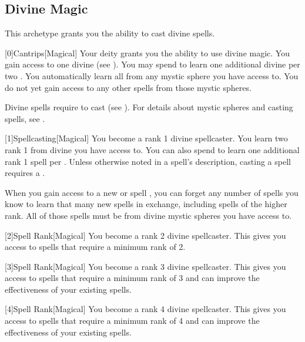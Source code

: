     \newpage
    \subsection{Divine Magic}
        This archetype grants you the ability to cast divine spells.

        [0]{Cantrips}[Magical]
        Your deity grants you the ability to use divine magic.
        You gain access to one divine  (see ).
        You may spend  to learn one additional divine  per two .
        You automatically learn all  from any mystic sphere you have access to.
        You do not yet gain access to any other spells from those mystic spheres.

        Divine spells require  to cast (see ).
        For details about mystic spheres and casting spells, see .

        [1]{Spellcasting}[Magical]
        You become a rank 1 divine spellcaster.
        You learn two rank 1  from divine  you have access to.
        You can also spend  to learn one additional rank 1 spell per .
        Unless otherwise noted in a spell's description, casting a spell requires a .

        When you gain access to a new  or spell ,
            you can forget any number of spells you know to learn that many new spells in exchange,
            including spells of the higher rank.
        All of those spells must be from divine mystic spheres you have access to.

        [2]{Spell Rank}[Magical] You become a rank 2 divine spellcaster.
        This gives you access to spells that require a minimum rank of 2.

        [3]{Spell Rank}[Magical] You become a rank 3 divine spellcaster.
        This gives you access to spells that require a minimum rank of 3 and can improve the effectiveness of your existing spells.

        [4]{Spell Rank}[Magical] You become a rank 4 divine spellcaster.
        This gives you access to spells that require a minimum rank of 4 and can improve the effectiveness of your existing spells.

